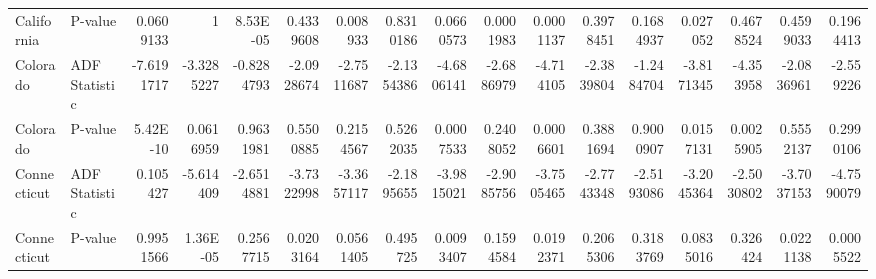 \begin{table}
{\begin{tabular}{llrrrrrrrrrrrrrrr}
            California  & P-value       & 0.0609133                           & 1                        & 8.53E-05                 & 0.4339608                & 0.008933                   & 0.8310186                & 0.0660573                  & 0.0001983               & 0.0001137               & 0.3978451                  & 0.1684937                  & 0.027052                  & 0.4678524                 & 0.4599033                        & 0.1964413                        \\
            Colorado    & ADF Statistic & -7.6191717                          & -3.3285227               & -0.8284793               & -2.0928674               & -2.7511687                 & -2.1354386               & -4.6806141                 & -2.6886979              & -4.714105               & -2.3839804                 & -1.2484704                 & -3.8171345                & -4.353958                 & -2.0836961                       & -2.559226                        \\
            Colorado    & P-value       & 5.42E-10                            & 0.0616959                & 0.9631981                & 0.5500885                & 0.2154567                  & 0.5262035                & 0.0007533                  & 0.2408052               & 0.0006601               & 0.3881694                  & 0.9000907                  & 0.0157131                 & 0.0025905                 & 0.5552137                        & 0.2990106                        \\
            Connecticut & ADF Statistic & 0.105427                            & -5.614409                & -2.6514881               & -3.7322998               & -3.3657117                 & -2.1895655               & -3.9815021                 & -2.9085756              & -3.7505465              & -2.7743348                 & -2.5193086                 & -3.2045364                & -2.5030802                & -3.7037153                       & -4.7590079                       \\
            Connecticut & P-value       & 0.9951566                           & 1.36E-05                 & 0.2567715                & 0.0203164                & 0.0561405                  & 0.495725                 & 0.0093407                  & 0.1594584               & 0.0192371               & 0.2065306                  & 0.3183769                  & 0.0835016                 & 0.326424                  & 0.0221138                        & 0.0005522                        \\

\end{tabular}}
\end{table}
